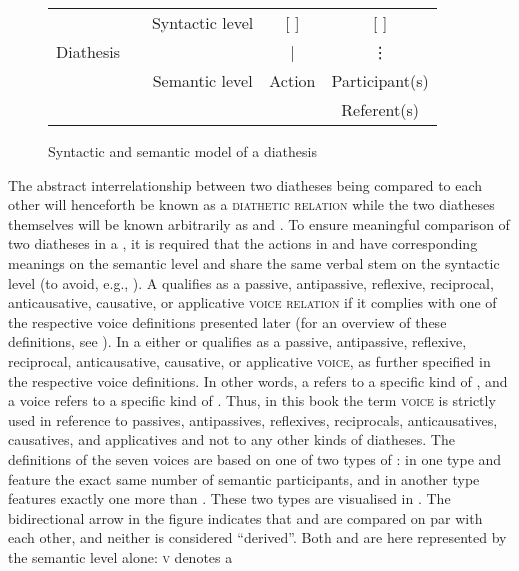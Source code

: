 \begin{figure}
	\caption{Syntactic and semantic model of a diathesis}
	\label{fig:ch2:diathesis}
	\begin{tabular}{c c c c c}
		& \multirow{3}{*}{\Big\langle} & Syntactic level & [  ] & [  ] \\
		Diathesis & & & | & ⋮ \\
		& & Semantic level & Action & Participant(s) \\
		& & & & Referent(s)\is{semantic referent} \\
	\end{tabular}
\end{figure}

The abstract interrelationship between two diatheses being compared to each other will henceforth be known as a \textsc{diathetic relation} while the two diatheses themselves will be known arbitrarily as  and . To ensure meaningful comparison of two diatheses in a , it is required that the actions in  and  have corresponding meanings on the semantic level and share the same verbal stem on the syntactic level (to avoid, e.g., ). A  qualifies as a passive, antipassive, reflexive, reciprocal, anticausative, causative, or applicative \textsc{voice relation} if it complies with one of the respective voice definitions presented later (for an overview of these definitions, see ). In a  either  or  qualifies as a passive, antipassive, reflexive, reciprocal, anticausative, causative, or applicative \textsc{voice}, as further specified in the respective voice definitions. In other words, a  refers to a specific kind of , and a voice refers to a specific kind of . Thus, in this book the term \textsc{voice} is strictly used in reference to passives, antipassives, reflexives, reciprocals, anticausatives, causatives, and applicatives and not to any other kinds of diatheses. The definitions of the seven voices are based on one of two types of : in one type  and  feature the exact same number of semantic participants, and in another type  features exactly one  more than . These two types are visualised in . The bidirectional arrow in the figure indicates that  and  are compared on par with each other, and neither is considered “derived”. Both  and  are here represented by the semantic level alone: \textsc{v} denotes a 